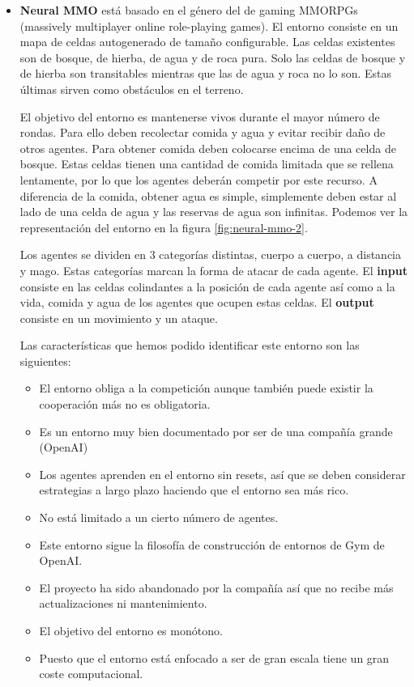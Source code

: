 \begin{itemize}
	\item \textbf{Neural MMO} \cite{neural-mmo-repo} está basado en el género del de gaming MMORPGs (massively multiplayer online role-playing games). El entorno consiste en un mapa de celdas autogenerado de tamaño configurable. Las celdas existentes son de bosque, de hierba, de agua y de roca pura. Solo las celdas de bosque y de hierba son transitables mientras que las de agua y roca no lo son. Estas últimas sirven como obstáculos en el terreno.  

	      El objetivo del entorno es mantenerse vivos durante el mayor número de rondas. Para ello deben recolectar comida y agua y evitar recibir daño de otros agentes. Para obtener comida deben colocarse encima de una celda de bosque. Estas celdas tienen una cantidad de comida limitada que se rellena lentamente, por lo que los agentes deberán competir por este recurso. A diferencia de la comida, obtener agua es simple, simplemente deben estar al lado de una celda de agua y las reservas de agua son infinitas. Podemos ver la representación del entorno en la figura \ref {fig:neural-mmo-2}.  

	      Los agentes se dividen en 3 categorías distintas, cuerpo a cuerpo, a distancia y mago. Estas categorías marcan la forma de atacar de cada agente.
	      El \textbf{input} consiste en las celdas colindantes a la posición de cada agente así como a la vida, comida y agua de los agentes que ocupen estas celdas. El \textbf{output} consiste en un movimiento y un ataque. 

	      Las características que hemos podido identificar este entorno son las siguientes:
	      \begin{itemize}
		      \item El entorno obliga a la competición aunque también puede existir la cooperación más no es obligatoria.
		      \item Es un entorno muy bien documentado por ser de una compañía grande (OpenAI) \cite {openia}
		      \item Los agentes aprenden en el entorno sin resets, así que se deben considerar estrategias a largo plazo haciendo que el entorno sea más rico.
		      \item No está limitado a un cierto número de agentes.
		      \item Este entorno sigue la filosofía de construcción de entornos de Gym de OpenAI.
		      \item El proyecto ha sido abandonado por la compañía así que no recibe más actualizaciones ni mantenimiento.
		      \item El objetivo del entorno es monótono.
		      \item Puesto que el entorno está enfocado a ser de gran escala tiene un gran coste computacional.
	      \end{itemize}


\end{itemize}
